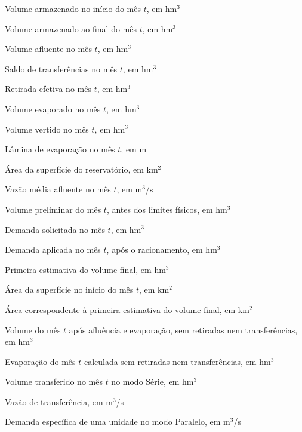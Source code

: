 
\begin{simbolos} \itemsep -1pt
    \item[$V_t$] Volume armazenado no início do mês $t$, em hm$^3$
    \item[$V_{t+1}$] Volume armazenado ao final do mês $t$, em hm$^3$
    \item[$I_t$] Volume afluente no mês $t$, em hm$^3$
    \item[$T_t$] Saldo de transferências no mês $t$, em hm$^3$
    \item[$R_t$] Retirada efetiva no mês $t$, em hm$^3$
    \item[$E_t$] Volume evaporado no mês $t$, em hm$^3$
    \item[$S_t$] Volume vertido no mês $t$, em hm$^3$
    \item[$e_t$] Lâmina de evaporação no mês $t$, em m
    \item[$A$] Área da superfície do reservatório, em km$^2$
    \item[$Q_t$] Vazão média afluente no mês $t$, em m$^3$/s
    \item[$P_t$] Volume preliminar do mês $t$, antes dos limites físicos, em hm$^3$
    \item[$D_t$] Demanda solicitada no mês $t$, em hm$^3$
    \item[$D^{a}_t$] Demanda aplicada no mês $t$, após o racionamento, em hm$^3$
    \item[$V^{*}_{t+1}$] Primeira estimativa do volume final, em hm$^3$
    \item[$A_t$] Área da superfície no início do mês $t$, em km$^2$
    \item[$A^{*}_{t+1}$] Área correspondente à primeira estimativa do volume final, em km$^2$
    \item[$V^{0}_t$] Volume do mês $t$ após afluência e evaporação, sem retiradas nem transferências, em hm$^3$
    \item[$E^{0}_t$] Evaporação do mês $t$ calculada sem retiradas nem transferências, em hm$^3$
    \item[$T^{\mathrm{env}}_t$] Volume transferido no mês $t$ no modo Série, em hm$^3$
    \item[$Q_{T}$] Vazão de transferência, em m$^3$/s
    \item[$Q^{e}$] Demanda específica de uma unidade no modo Paralelo, em m$^3$/s

\end{simbolos}
